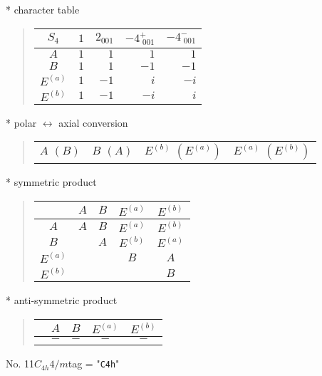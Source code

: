 \documentclass[fleqn,10pt,landscape]{jsarticle}
\begin{document}
* character table
\begin{quote}
\begin{tabular}{crrrr} \hline \hline
$ S_{4} $ & $ 1 $ & $ 2{}_{001} $ & $ -4^{+}_{\,\,001} $ & $ -4^{-}_{\,\,001} $ \\ \hline
$ A $ & $ 1 $ & $ 1 $ & $ 1 $ & $ 1 $ \\
$ B $ & $ 1 $ & $ 1 $ & $ -1 $ & $ -1 $ \\
$ E^{(a)} $ & $ 1 $ & $ -1 $ & $ i $ & $ - i $ \\
$ E^{(b)} $ & $ 1 $ & $ -1 $ & $ - i $ & $ i $ \\
 \hline \hline
\end{tabular}
\end{quote}
* polar $\leftrightarrow$ axial conversion
\begin{quote}
\begin{tabular}{cccc}
$ A\,\,(B) $ & $ B\,\,(A) $ & $ E^{(b)}\,\,(E^{(a)}) $ & $ E^{(a)}\,\,(E^{(b)}) $
\end{tabular}
\end{quote}
* symmetric product
\begin{quote}
\begin{tabular}{c|cccc} \hline \hline
 & $ A $ & $ B $ & $ E^{(a)} $ & $ E^{(b)} $ \\ \hline
$ A $ & $ A $ & $ B $ & $ E^{(a)} $ & $ E^{(b)} $ \\
$ B $ & $  $ & $ A $ & $ E^{(b)} $ & $ E^{(a)} $ \\
$ E^{(a)} $ & $  $ & $  $ & $ B $ & $ A $ \\
$ E^{(b)} $ & $  $ & $  $ & $  $ & $ B $ \\
 \hline \hline
\end{tabular}
\end{quote}
* anti-symmetric product
\begin{quote}
\begin{tabular}{ccccc} \hline \hline
 & $ A $ & $ B $ & $ E^{(a)} $ & $ E^{(b)} $ \\ \hline
$  $ & $ - $ & $ - $ & $ - $ & $ - $ \\
 \hline \hline
\end{tabular}
\end{quote}
\newpage
No. 11\quad$C_{4h}$\quad$4/m$\quad[ tetragonal ]
tag = "{\tt C4h}"
\end{document}
